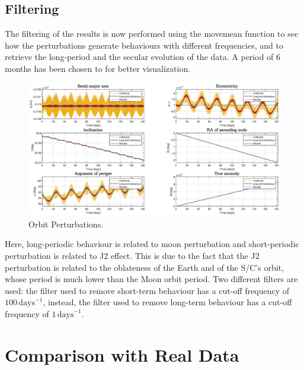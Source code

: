 \documentclass{article}
\begin{document}
\subsection{Filtering} 

The filtering of the results is now performed using the movemean function to see how the perturbations generate behaviours with different frequencies, and to retrieve the long-period and the secular evolution of the data. A period of 6 months has been chosen to for better visualization. 

\begin{figure}[H]
	\centering
	\includegraphics[width=1\textwidth]{filter0.5year.eps}
	\caption{Orbit Perturbations.}
	\label{fig:filtering}
\end{figure}

Here, long-periodic behaviour is related to moon perturbation and short-periodic perturbation is related to J2 effect. This is due to the fact that the J2 perturbation is related to the oblateness of the Earth and of the S/C’s orbit, whose period is much lower than the Moon orbit period. Two different filters are used: the filter used to remove short-term behaviour has a cut-off frequency of \(100 \, \text{days}^{-1}\), instead, the filter used to remove long-term behaviour has a cut-off frequency of \(1 \, \text{days}^{-1}\).


\section{Comparison with Real Data}
\end{document}
